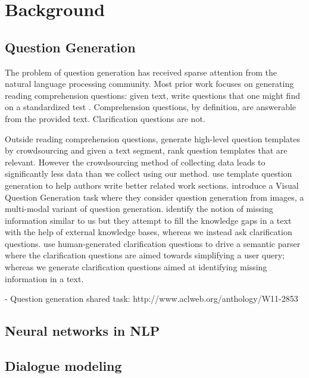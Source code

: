 \documentclass[11pt]{report}
\renewcommand\cite{\citep}	%
\begin{document}
\newpage

\chapter{Background}\label{background}

\section{Question Generation}

The problem of question generation has received sparse attention from the natural language processing community. Most prior work focuses on generating reading comprehension questions:  given text, write questions that one might find on a standardized test \cite{vanderwende2008importance,heilman2011automatic,rus2011question,olney2012question}.  Comprehension questions, by definition, are answerable from the provided text. Clarification questions are not.  

Outside reading comprehension questions, \cite{labutov2015deep} generate high-level question templates by crowdsourcing and given a text segment, rank question templates that are relevant. However the crowdsourcing method of collecting data leads to significantly less data than we collect using our method. \cite{liu2010automatic} use template question generation to help authors write better related work sections. \cite{mostafazadeh2016generating} introduce a Visual Question Generation task where they consider question generation from images, a multi-modal variant of question generation. 
\cite{penas2010filling} identify the notion of missing information similar to us but they attempt to fill the knowledge gaps in a text with the help of external knowledge bases, whereas we instead ask clarification questions. 
\cite{artzi2011bootstrapping} use human-generated clarification questions to drive a semantic parser where the clarification questions are aimed towards simplifying a user query; whereas we generate clarification questions aimed at  identifying missing information in a text. 

- Question generation shared task: http://www.aclweb.org/anthology/W11-2853

\section{Neural networks in NLP}

\section{Dialogue modeling}
\end{document}
